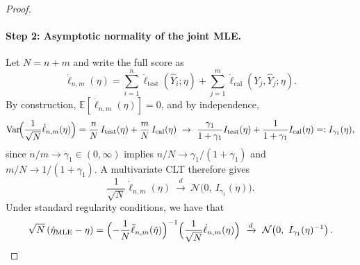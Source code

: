 \begin{proof}
\paragraph{Step 2: Asymptotic normality of the joint MLE.}
Let $N=n+m$ and write the full score as
\[
\dot\ell_{n,m}(\eta)=\sum_{i=1}^n \dot\ell_{\mathrm{test}}(\hat Y_i;\eta)
+\sum_{j=1}^m \dot\ell_{\mathrm{cal}}(Y_j,\hat Y_j;\eta).
\]
By construction, $\mathbb E[\dot\ell_{n,m}(\eta)]=0$, and by independence,
\[
\mathrm{Var}\!\Bigl(\frac{1}{\sqrt N}\dot\ell_{n,m}(\eta)\Bigr)
=
\frac{n}{N}\,I_{\mathrm{test}}(\eta)+\frac{m}{N}\,I_{\mathrm{cal}}(\eta)
\ \to\
\frac{\gamma_1}{1+\gamma_1}I_{\mathrm{test}}(\eta)+\frac{1}{1+\gamma_1}I_{\mathrm{cal}}(\eta)
=:I_{\gamma_1}(\eta),
\]
since $n/m\to\gamma_1\in(0,\infty)$ implies $n/N\to\gamma_1/(1+\gamma_1)$ and $m/N\to 1/(1+\gamma_1)$.
A multivariate CLT therefore gives
\[
\frac{1}{\sqrt N}\dot\ell_{n,m}(\eta)\ \xrightarrow{d}\ \mathcal N\!\bigl(0,\ I_{\gamma_1}(\eta)\bigr).
\]
Under standard regularity conditions, we have that
\[
\sqrt N\,(\hat\eta_{\mathrm{MLE}}-\eta)
=
\Bigl(-\frac{1}{N}\ddot\ell_{n,m}(\tilde\eta)\Bigr)^{-1}
\Bigl(\frac{1}{\sqrt N}\dot\ell_{n,m}(\eta)\Bigr)
\ \xrightarrow{d}\
\mathcal N\!\left(0,\ I_{\gamma_1}(\eta)^{-1}\right).
\]


\end{proof}
